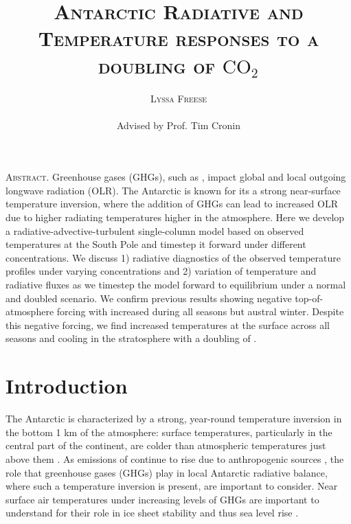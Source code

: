 \documentclass[12]{article}
\title{{\textsc{\Large Antarctic Radiative and Temperature responses to a doubling of $\text{CO}_2$}}}
\author{\textsc{Lyssa Freese}
\\\\
Advised by Prof. Tim Cronin}
\begin{document}
\maketitle
\thispagestyle{empty}

\setlength{\leftskip}{1.1cm}
\setlength{\rightskip}{1.1cm}


\bigskip
\bigskip

{\textsc{Abstract.} }
Greenhouse gases (GHGs), such as , impact global and local outgoing longwave radiation (OLR). The Antarctic is known for its a strong near-surface temperature inversion, where the addition of GHGs can lead to increased OLR due to higher radiating temperatures higher in the atmosphere. Here we develop a radiative-advective-turbulent single-column model based on observed temperatures at the South Pole and timestep it forward under different  concentrations. We discuss 1) radiative diagnostics of the observed temperature profiles under varying  concentrations and 2) variation of temperature and radiative fluxes as we timestep the model forward to equilibrium under a normal and doubled  scenario. We confirm previous results showing negative top-of-atmosphere forcing with increased  during all seasons but austral winter. Despite this negative forcing, we find increased temperatures at the surface across all seasons and cooling in the stratosphere with a doubling of .
\bigskip
\bigskip 
\clearpage
\setcounter{page}{1}

\setlength{\leftskip}{0cm}
\setlength{\rightskip}{0cm}

\section{Introduction}
The Antarctic is characterized by a strong, year-round temperature inversion in the bottom 1 km of the atmosphere: surface temperatures, particularly in the central part of the continent, are colder than atmospheric temperatures just above them \citep{hudson_look_2005}. As emissions of  continue to rise due to anthropogenic sources \citep{peters_carbon_2020}, the role that greenhouse gases (GHGs) play in local Antarctic radiative balance, where such a temperature inversion is present, are important to consider. Near surface air temperatures under increasing levels of GHGs are important to understand for their role in ice sheet stability and thus sea level rise \citep{hanna_ice-sheet_2013}. 
\end{document}
